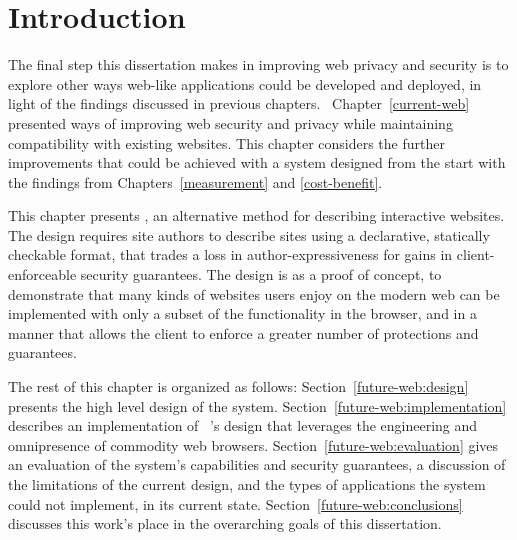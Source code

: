 \section{Introduction}
\label{future-web:introduction}

The final step this dissertation makes in improving web privacy and security is
to explore other ways web-like applications could be developed and deployed, in
light of the findings discussed in previous chapters.  Chapter~\ref{current-web}
presented ways of improving web security and privacy while maintaining
compatibility with existing websites. This chapter considers the further
improvements that could be achieved with a system designed from the start with
the findings from Chapters~\ref{measurement} and \ref{cost-benefit}.

This chapter presents \CDF, an alternative method for describing interactive
websites. The design requires site authors to describe sites using a
declarative, statically checkable format, that trades a loss in
author-expressiveness for gains in client-enforceable security guarantees.  The
design is as a proof of concept, to demonstrate that many kinds of websites
users enjoy on the modern web can be implemented with only a subset of the
functionality in the browser, and in a manner that allows the client to enforce
a greater number of protections and guarantees.

The rest of this chapter is organized as follows:
Section~\ref{future-web:design} presents the high level design of the system.
Section~\ref{future-web:implementation} describes an implementation of \CDF~'s
design that leverages the engineering and omnipresence of commodity web
browsers.  Section~\ref{future-web:evaluation} gives an evaluation of the
system's capabilities and security guarantees, a discussion of the limitations
of the current design, and the types of applications the system could not
implement, in its current state.  Section~\ref{future-web:conclusions}
discusses this work's place in the overarching goals of this dissertation.
